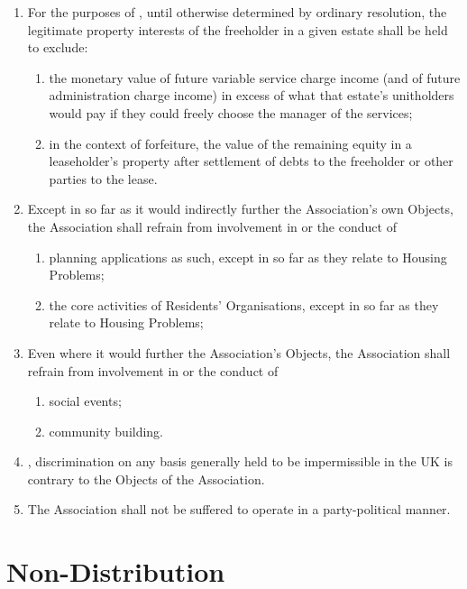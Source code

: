 \documentclass[10pt]{mk-articles-of-association}
\newcommand{\mysection}[1]{
  \end{enumerate}
  \section*{#1}
  \begin{enumerate}[resume]
}
\newcommand{\RA}[0]{Residents' Organisation}
\begin{document}
\begin{enumerate}
\item For the purposes of , until otherwise determined by
  ordinary resolution, the legitimate property
  interests of the freeholder in a given estate shall be held to
  exclude:
  \begin{enumerate}
    \item the monetary value of future variable service charge income
      (and of future administration charge income) in excess of what
      that estate's unitholders would pay if they could freely choose
      the manager of the services; \ITand
    \item in the context of forfeiture, the value of the remaining equity in a
      leaseholder's property after settlement of debts to the freeholder or
      other parties to the lease.
  \end{enumerate}

\item Except in so far as it would indirectly further the Association's own
  Objects, the Association shall refrain from involvement in or the conduct of
  \begin{enumerate}
  \item planning applications as such, except in so far as they relate
    to Housing Problems;
  \item the core activities of \RA{}s, except in so far as they
    relate to Housing Problems;
  \end{enumerate}

\item Even where it would further the Association's Objects, the Association
  shall refrain from involvement in or the conduct of
  \begin{enumerate}
  \item social events; \ITand
  \item community building.
  \end{enumerate}

\item \avoiddoubt, discrimination on any basis generally held to be
  impermissible in the UK is contrary to the Objects of the
  Association.

\item The Association shall not be suffered to operate in
  a party-political manner.



\mysection{Non-Distribution}


\end{enumerate}
\end{document}
